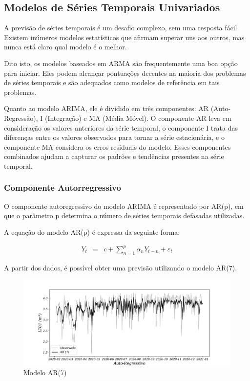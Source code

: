 \subsection{Modelos de S\'eries Temporais Univariados}\label{subsec:arima}

A previsão de séries temporais é um desafio complexo, sem uma resposta fácil. Existem inúmeros modelos estatísticos que afirmam superar uns aos outros, mas nunca está claro qual modelo é o melhor.

Dito isto, os modelos baseados em ARMA são frequentemente uma boa opção para iniciar. Eles podem alcançar pontuações decentes na maioria dos problemas de séries temporais e são adequados como modelos de referência em tais problemas.

Quanto ao modelo ARIMA, ele é dividido em três componentes: AR (Auto-Regressão), I (Integração) e MA (Média Móvel). O componente AR leva em consideração os valores anteriores da série temporal, o componente I trata das diferenças entre os valores observados para tornar a série estacionária, e o componente MA considera os erros residuais do modelo. Esses componentes combinados ajudam a capturar os padrões e tendências presentes na série temporal.

\subsubsection{Componente Autorregressivo}

O componente autoregressivo do modelo ARIMA é representado por AR(p), em que o parâmetro p determina o número de séries temporais defasadas utilizadas.

A equação do modelo AR(p) é expressa da seguinte forma:

\begin{eqnarray}
	Y_t&=&c+\sum_{n=1}^{p} \alpha_n Y_{t-n} + \varepsilon_t\label{AR}
\end{eqnarray}

A partir dos dados, é possível obter uma previsão utilizando o modelo AR(7).

\begin{figure}[H]
	\centering
	\caption{Modelo AR(7)  }
	\label{fig:1-ar}
	\includegraphics[width=0.9\linewidth]{Modelos/Figuras/0-AR}
	
\end{figure}

